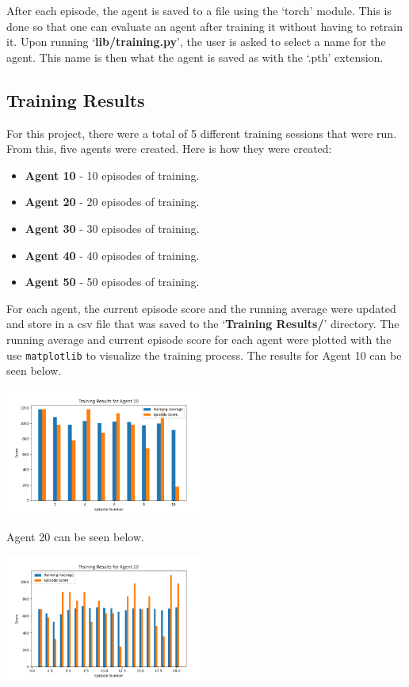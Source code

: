 \documentclass[
	a4paper, %
	10pt, %
	unnumberedsections, %
	twoside, %
]{LTJournalArticle}
\begin{document}
After each episode, the agent is saved to a file using the `torch' module. This is done so that one can evaluate an agent after training it without having to retrain it. Upon running `\textbf{lib/training.py}',
the user is asked to select a name for the agent. This name is then what the agent is saved as with the `.pth' extension.

\subsection{Training Results}

For this project, there were a total of 5 different training sessions that were run. From this, five agents were created. Here is how they were created:

\begin{itemize}
	\item \textbf{Agent 10} - 10 episodes of training.
	\item \textbf{Agent 20} - 20 episodes of training.
	\item \textbf{Agent 30} - 30 episodes of training.
	\item \textbf{Agent 40} - 40 episodes of training.
	\item \textbf{Agent 50} - 50 episodes of training.
\end{itemize}

For each agent, the current episode score and the running average were updated and store in a csv file that was saved to the `\textbf{Training Results/}' directory. The running average and current episode
score for each agent were plotted with the use \texttt{matplotlib} to visualize the training process. The results for Agent 10 can be seen below.

\begin{center}
	\includegraphics[width=0.5\textwidth]{Figures/Agent 10 Training.png}
\end{center}

Agent 20 can be seen below.

\begin{center}
	\includegraphics[width=0.5\textwidth]{Figures/Agent 20 Training.png}
\end{center}
\end{document}
